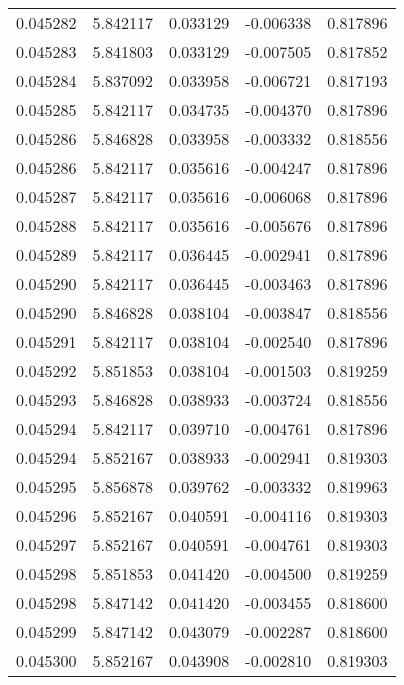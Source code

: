 \begin{tabular}{lrrrr}
0.045282    &  5.842117 &  0.033129 & -0.006338 &             0.817896 \\
0.045283    &  5.841803 &  0.033129 & -0.007505 &             0.817852 \\
0.045284    &  5.837092 &  0.033958 & -0.006721 &             0.817193 \\
0.045285    &  5.842117 &  0.034735 & -0.004370 &             0.817896 \\
0.045286    &  5.846828 &  0.033958 & -0.003332 &             0.818556 \\
0.045286    &  5.842117 &  0.035616 & -0.004247 &             0.817896 \\
0.045287    &  5.842117 &  0.035616 & -0.006068 &             0.817896 \\
0.045288    &  5.842117 &  0.035616 & -0.005676 &             0.817896 \\
0.045289    &  5.842117 &  0.036445 & -0.002941 &             0.817896 \\
0.045290    &  5.842117 &  0.036445 & -0.003463 &             0.817896 \\
0.045290    &  5.846828 &  0.038104 & -0.003847 &             0.818556 \\
0.045291    &  5.842117 &  0.038104 & -0.002540 &             0.817896 \\
0.045292    &  5.851853 &  0.038104 & -0.001503 &             0.819259 \\
0.045293    &  5.846828 &  0.038933 & -0.003724 &             0.818556 \\
0.045294    &  5.842117 &  0.039710 & -0.004761 &             0.817896 \\
0.045294    &  5.852167 &  0.038933 & -0.002941 &             0.819303 \\
0.045295    &  5.856878 &  0.039762 & -0.003332 &             0.819963 \\
0.045296    &  5.852167 &  0.040591 & -0.004116 &             0.819303 \\
0.045297    &  5.852167 &  0.040591 & -0.004761 &             0.819303 \\
0.045298    &  5.851853 &  0.041420 & -0.004500 &             0.819259 \\
0.045298    &  5.847142 &  0.041420 & -0.003455 &             0.818600 \\
0.045299    &  5.847142 &  0.043079 & -0.002287 &             0.818600 \\
0.045300    &  5.852167 &  0.043908 & -0.002810 &             0.819303 \\

\end{tabular}
